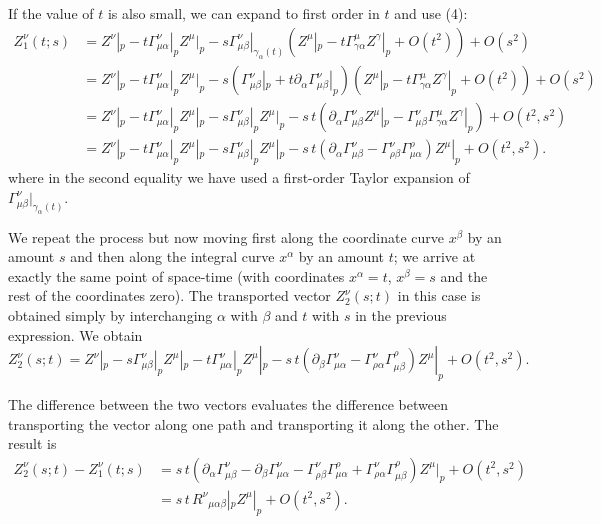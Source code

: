 \begin{points}
\item If the value of $t$ is also small, we can expand to first order in $t$ and use (4):
\begin{align*}
  Z^\nu_1(t;s)&=Z^\nu|_p-t\Gamma^\nu_{\mu\alpha}|_pZ^\mu|_p-s\left.\Gamma^\nu_{\mu\beta}\right|_{\gamma_\alpha(t)}\left(Z^\mu|_p-t\Gamma^\mu_{\gamma\alpha}Z^\gamma|_p+O(t^2)\right)+O(s^2)\\
  &=Z^\nu|_p-t\Gamma^\nu_{\mu\alpha}|_pZ^\mu|_p-s\left(\Gamma^\nu_{\mu\beta}|_p+t\partial_\alpha\Gamma^\nu_{\mu\beta}|_p\right)\left(Z^\mu|_p-t\Gamma^\mu_{\gamma\alpha}Z^\gamma|_p+O(t^2)\right)+O(s^2)\\
  &=Z^\nu|_p-t\Gamma^\nu_{\mu\alpha}|_pZ^\mu|_p-s\Gamma^\nu_{\mu\beta}|_pZ^\mu|_p-s\,t\left(\partial_\alpha\Gamma^\nu_{\mu\beta}Z^\mu|_p-\Gamma^\nu_{\mu\beta}\Gamma^\mu_{\gamma\alpha}Z^\gamma|_p\right)+O(t^2,s^2)\\
  &=Z^\nu|_p-t\Gamma^\nu_{\mu\alpha}|_pZ^\mu|_p-s\Gamma^\nu_{\mu\beta}|_pZ^\mu|_p-s\,t\left(\partial_\alpha\Gamma^\nu_{\mu\beta}-\Gamma^\nu_{\rho\beta}\Gamma^\rho_{\mu\alpha}\right)Z^\mu|_p+O(t^2,s^2).
\end{align*}
where in the second equality we have used a first-order Taylor expansion of $\Gamma^\nu_{\mu\beta}|_{\gamma_\alpha(t)}$.

\item We repeat the process but now moving first along the coordinate curve $x^\beta$ by an amount $s$ and then along the integral curve $x^\alpha$ by an amount $t$; we arrive at exactly the same point of space-time (with coordinates $x^\alpha=t$, $x^\beta=s$ and the rest of the coordinates zero). The transported vector $Z^\nu_2(s;t)$ in this case is obtained simply by interchanging $\alpha$ with $\beta$ and $t$ with $s$ in the previous expression. We obtain
\[
  Z^\nu_2(s;t)=Z^\nu|_p-s\Gamma^\nu_{\mu\beta}|_pZ^\mu|_p-t\Gamma^\nu_{\mu\alpha}|_pZ^\mu|_p-s\,t\left(\partial_\beta\Gamma^\nu_{\mu\alpha}-\Gamma^\nu_{\rho\alpha}\Gamma^\rho_{\mu\beta}\right)Z^\mu|_p+O(t^2,s^2).
\]

\item The difference between the two vectors evaluates the difference between transporting the vector along one path and transporting it along the other. The result is
\begin{align*}
  Z^\nu_2(s;t)-Z^\nu_1(t;s)&=s\,t\left(\partial_\alpha\Gamma^\nu_{\mu\beta}-\partial_\beta\Gamma^\nu_{\mu\alpha}-\Gamma^\nu_{\rho\beta}\Gamma^\rho_{\mu\alpha}+\Gamma^\nu_{\rho\alpha}\Gamma^\rho_{\mu\beta}\right)Z^\mu|_p+O(t^2,s^2)\\
  &=s\,t\,R^\nu{}_{\mu\alpha\beta}|_pZ^\mu|_p+O(t^2,s^2).
\end{align*}


\end{points}

